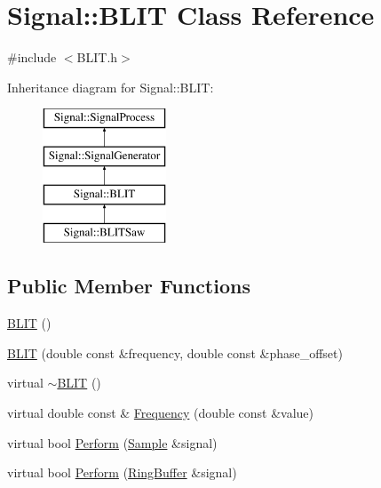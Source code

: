 \hypertarget{class_signal_1_1_b_l_i_t}{\section{Signal\+:\+:B\+L\+I\+T Class Reference}
\label{class_signal_1_1_b_l_i_t}
}


{\ttfamily \#include $<$B\+L\+I\+T.\+h$>$}

Inheritance diagram for Signal\+:\+:B\+L\+I\+T\+:\begin{figure}[H]
\begin{center}
\leavevmode
\includegraphics[height=4.000000cm]{class_signal_1_1_b_l_i_t}
\end{center}
\end{figure}
\subsection*{Public Member Functions}
\begin{DoxyCompactItemize}
\item 
\hyperlink{class_signal_1_1_b_l_i_t_a15ce7fdad59925c403e2e789bb7348e2}{B\+L\+I\+T} ()
\item 
\hyperlink{class_signal_1_1_b_l_i_t_a11752682082d258f8ef4f516d3d936f7}{B\+L\+I\+T} (double const \&frequency, double const \&phase\+\_\+offset)
\item 
virtual \hyperlink{class_signal_1_1_b_l_i_t_a408ab9b532d43f25d8531dffc741cd36}{$\sim$\+B\+L\+I\+T} ()
\item 
virtual double const \& \hyperlink{class_signal_1_1_b_l_i_t_a911a6d5d3e218613b4740d4321f7207e}{Frequency} (double const \&value)
\item 
virtual bool \hyperlink{class_signal_1_1_b_l_i_t_abf70cd38b2b848800b34de8baaf366b3}{Perform} (\hyperlink{class_signal_1_1_sample}{Sample} \&signal)
\item 
virtual bool \hyperlink{class_signal_1_1_b_l_i_t_a3b18e1f25f0900de4cf709cfc849b4c7}{Perform} (\hyperlink{class_signal_1_1_ring_buffer}{Ring\+Buffer} \&signal)
\end{DoxyCompactItemize}
